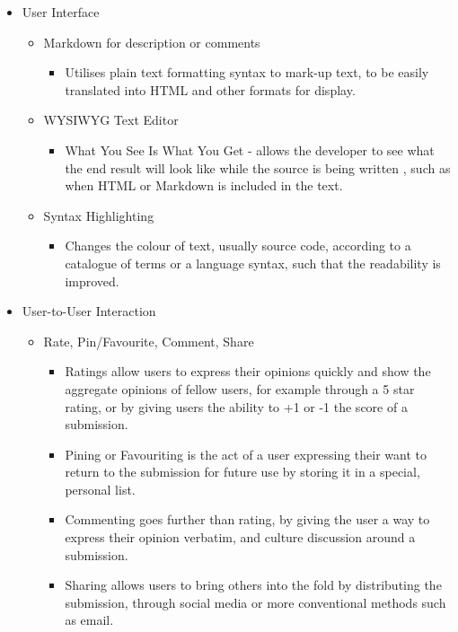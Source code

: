 \begin{itemize} 
	\item User Interface
	\begin{itemize} 
		\item Markdown for description or comments
		\begin{itemize}
			\item Utilises plain text formatting syntax to mark-up text, to be easily translated into HTML and other formats for display. \cite{Markdown2004}
		\end{itemize}
		\item WYSIWYG Text Editor
		\begin{itemize}
			\item What You See Is What You Get - allows the developer to see what the end result will look like while the source is being written \cite{Oxfordnd}, such as when HTML or Markdown is included in the text.
		\end{itemize}
		\item Syntax Highlighting
		\begin{itemize}
			\item Changes the colour of text, usually source code, according to a catalogue of terms or a language syntax, such that the readability is improved.
		\end{itemize}
	\end{itemize}

	\item User-to-User Interaction
	\begin{itemize}
		\item Rate, Pin/Favourite, Comment, Share
		\begin{itemize}
			\item Ratings allow users to express their opinions quickly and show the aggregate opinions of fellow users, for example through a 5 star rating, or by giving users the ability to +1 or -1 the score of a submission.
			\item Pining or Favouriting is the act of a user expressing their want to return to the submission for future use by storing it in a special, personal list.
			\item Commenting goes further than rating, by giving the user a way to express their opinion verbatim, and culture discussion around a submission.
			\item Sharing allows users to bring others into the fold by distributing the submission, through social media or more conventional methods such as email.


\end{itemize}
\end{itemize}
\end{itemize}
